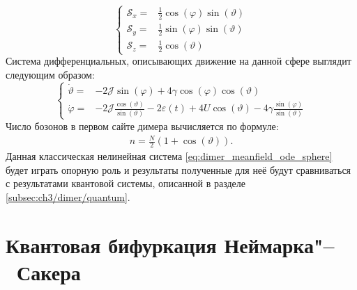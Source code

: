 \begin{equation}
	\label{eq:dimer_meanfield_sphere}
	\left\{
	\begin{array}{rl}
		\mathscr{S}_x = & \frac{1}{2} \cos{\left(\varphi\right)}\sin{\left(\vartheta\right)}\\
		\mathscr{S}_y = & \frac{1}{2} \sin{\left(\varphi\right)}\sin{\left(\vartheta\right)}\\
		\mathscr{S}_z = & \frac{1}{2} \cos{\left(\vartheta\right)}
	\end{array}
	\right.
\end{equation}
Система дифференциальных, описывающих движение на данной сфере выглядит следующим образом:
\begin{equation}
	\label{eq:dimer_meanfield_ode_sphere}
	\left\{
	\begin{array}{rl}
		\dot{\vartheta} = & -2\mathcal{J}\sin{\left(\varphi\right)} + 4\gamma \cos{\left(\varphi\right)}\cos{\left(\vartheta\right)} \\
		\dot{\varphi} = & -2 \mathcal{J} \frac{\cos{\left(\vartheta\right)}}{\sin{\left(\vartheta\right)}} - 2\varepsilon\left(t\right) + 4U \cos{\left(\vartheta\right)} - 4\gamma\frac{\sin{\left(\varphi\right)}}{\sin{\left(\vartheta\right)}}
	\end{array}
	\right.
\end{equation}
Число бозонов в первом сайте димера вычисляется по формуле:
\begin{equation}
	\label{eq:dimer_meanfield_num_bosons}
	\begin{gathered}
		n=\frac{N}{2}(1+\cos{\left(\vartheta\right)}).
	\end{gathered}
\end{equation}
Данная классическая нелинейная система \cref{eq:dimer_meanfield_ode_sphere} будет играть опорную роль и результаты полученные для неё будут сравниваться с результатами квантовой системы, описанной в разделе \cref{subsec:ch3/dimer/quantum}.

\section{Квантовая бифуркация Неймарка"--~Сакера}\label{sec:ch3/neimark}

